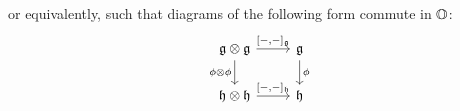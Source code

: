\begin{definition}
                        or equivalently, such that diagrams of the following form commute in $\mathbb{O}$:
                            $$
                                \begin{tikzcd}
                                	{\g \tensor \g} & {\g} \\
                                	{\h \tensor \h} & {\h}
                                	\arrow["{\phi}", from=1-2, to=2-2]
                                	\arrow["{\phi \tensor \phi}"', from=1-1, to=2-1]
                                	\arrow["{[-,-]_{\h}}", from=2-1, to=2-2]
                                	\arrow["{[-,-]_{\g}}", from=1-1, to=1-2]
                                \end{tikzcd}
                            $$
                    \end{definition}
                    
